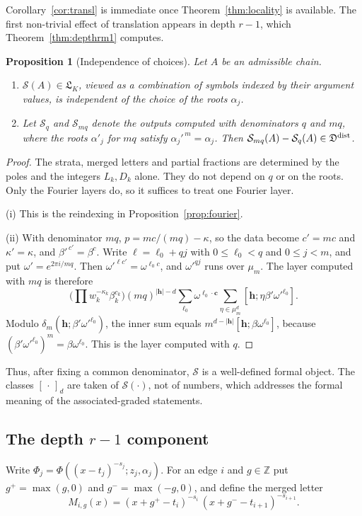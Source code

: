 \documentclass[11pt]{amsart}
\newtheorem{proposition}[theorem]{Proposition}
\theoremstyle{definition}
\theoremstyle{remark}
\numberwithin{equation}{section}
\newcommand{\Z}{\mathbb{Z}}
\newcommand{\cS}{\mathcal{S}}
\newcommand{\fL}{\mathfrak{L}}
\newcommand{\fD}{\mathfrak{D}}
\newcommand{\cb}{\mathbf{c}}
\newcommand{\hb}{\mathbf{h}}
\newcommand{\lb}{\boldsymbol{\ell}}
\begin{document}
Corollary~\ref{cor:transl} is immediate once Theorem~\ref{thm:locality} is available. The first non-trivial effect of translation appears in depth $r-1$, which Theorem~\ref{thm:depthrm1} computes.

\begin{proposition}[Independence of choices]\label{prop:choices}
Let $A$ be an admissible chain.
\begin{enumerate}[label=(\roman*),leftmargin=2em]
\item $\cS(A)\in\fL_K$, viewed as a combination of symbols indexed by their argument values, is independent of the choice of the roots $\alpha_j$.
\item Let $\cS_q$ and $\cS_{mq}$ denote the outputs computed with denominators $q$ and $mq$, where the roots $\alpha'_j$ for $mq$ satisfy $\alpha_j'^{\,m}=\alpha_j$. Then $\cS_{mq}(A)-\cS_q(A)\in\fD^{\rm dist}$.
\end{enumerate}
\end{proposition}
\begin{proof}
The strata, merged letters and partial fractions are determined by the poles and the integers $L_k,D_k$ alone. They do not depend on $q$ or on the roots. Only the Fourier layers do, so it suffices to treat one Fourier layer.

(i) This is the reindexing in Proposition~\ref{prop:fourier}.

(ii) With denominator $mq$, $p=mc/(mq)-\kappa$, so the data become $c'=mc$ and $\kappa'=\kappa$, and $\beta'^{\,c'}=\beta^{c}$. Write $\ell=\ell_0+qj$ with $0\le\ell_0<q$ and $0\le j<m$, and put $\omega'=e^{2\pi i/mq}$. Then $\omega'^{\ell c'}=\omega^{\ell_0c}$, and $\omega'^{qj}$ runs over $\mu_m$. The layer computed with $mq$ is therefore
\[
\Big(\prod w_k^{-\kappa_k}\beta_k^{c_k}\Big)(mq)^{|\hb|-d}\sum_{\lb_0}\omega^{\lb_0\cdot\cb}\sum_{\eta\in\mu_m^d}[\hb;\eta\beta'\omega'^{\lb_0}].
\]
Modulo $\delta_m(\hb;\beta'\omega'^{\lb_0})$, the inner sum equals $m^{d-|\hb|}[\hb;\beta\omega^{\lb_0}]$, because $(\beta'\omega'^{\ell_0})^m=\beta\omega^{\ell_0}$. This is the layer computed with $q$.
\end{proof}

Thus, after fixing a common denominator, $\cS$ is a well-defined formal object. The classes $[\,\cdot\,]_d$ are taken of $\cS(\cdot)$, not of numbers, which addresses the formal meaning of the associated-graded statements.

\subsection{The depth \texorpdfstring{$r-1$}{r-1} component}
Write $\Phi_j=\Phi((x-t_j)^{-s_j};z_j,\alpha_j)$. For an edge $i$ and $g\in\Z$ put $g^+=\max(g,0)$ and $g^-=\max(-g,0)$, and define the merged letter
\[
M_{i,g}(x)=(x+g^+-t_i)^{-s_i}\,(x+g^--t_{i+1})^{-s_{i+1}} .
\]
\end{document}
